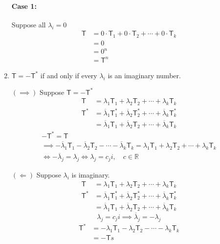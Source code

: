\begin{enumerate}
\paragraph{Case 1:} Suppose all $\lambda_i =0$ 
\begin{align}
\mathsf{T} &= 0\cdot \mathsf{T}_1 + 0\cdot \mathsf{T}_2 + \dotsb +
0\cdot \mathsf{T}_k\\
&= 0\\
&= 0^n\\
&= \mathsf{T}^n
\end{align}
\item $\mathsf{T}= -\mathsf{T}^*$ if and only if every $\lambda_i$ is
  an imaginary number.

$(\implies)$ Suppose $\mathsf{T}= -\mathsf{T}^*$
\begin{align}
\mathsf{T} &= \lambda_1\mathsf{T}_1 + \lambda_2\mathsf{T}_2 + \dotsb +
\lambda_k\mathsf{T}_k\\ 
\mathsf{T}^* &= \overline{\lambda}_1\mathsf{T}_1^* +
\overline{\lambda}_2\mathsf{T}_2^* + \dotsb +
\overline{\lambda}_k\mathsf{T}_k^*\\ 
&= \overline{\lambda}_1\mathsf{T}_1 +
\overline{\lambda}_2\mathsf{T}_2 + \dotsb +
\overline{\lambda}_k\mathsf{T}_k
\end{align}
\begin{gather}
-\mathsf{T}^* = \mathsf{T}\\
\implies -\overline{\lambda}_1\mathsf{T}_1 -
\overline{\lambda}_2\mathsf{T}_2 - \dotsb -
\overline{\lambda}_k\mathsf{T}_k =  \lambda_1\mathsf{T}_1 +
\lambda_2\mathsf{T}_2 + \dotsb + \lambda_k\mathsf{T}_k\\
\Leftrightarrow -\overline{\lambda}_j = \lambda_j \Leftrightarrow
\lambda_j = c_ji, \quad c \in \mathbb{R}
\end{gather}

$(\Leftarrow)$ Suppose $\lambda_i$ is imaginary.
\begin{align}
\mathsf{T} &= \lambda_1\mathsf{T}_1 + \lambda_2\mathsf{T}_2 + \dotsb +
\lambda_k\mathsf{T}_k\\
\mathsf{T}^* &= \overline{\lambda}_1\mathsf{T}_1^* +
\overline{\lambda}_2\mathsf{T}_2^* + \dotsb + 
\overline{\lambda}_k\mathsf{T}_k^*\\
&= \overline{\lambda}_1\mathsf{T}_1 +
\overline{\lambda}_2\mathsf{T}_2 + \dotsb + 
\overline{\lambda}_k\mathsf{T}_k
\end{align}
\begin{equation}
\lambda_j = c_ji \implies \overline{\lambda}_j = -\lambda_j
\end{equation}
\begin{align}
\mathsf{T}^* &= -\lambda_1\mathsf{T}_1 -\lambda_2\mathsf{T}_2 - \dotsb
- \lambda_k\mathsf{T}_k\\
&= -\mathsf{T}s
\end{align}
\end{enumerate}
